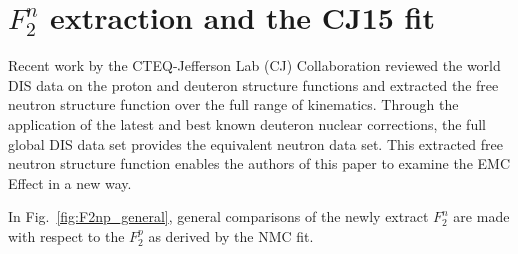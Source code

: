 \documentclass[oneside]{article}
\begin{document}
\section{$F_2^n$ extraction and the CJ15 fit}

Recent work by the CTEQ-Jefferson Lab (CJ) Collaboration reviewed the world DIS data on the proton and deuteron structure functions and extracted the free neutron structure function over the full range of kinematics. Through the application of the latest and best known deuteron nuclear corrections, the full global DIS data set provides the equivalent neutron data set. This extracted free neutron structure function enables the authors of this paper to examine the EMC Effect in a new way. 

In Fig.~\ref{fig:F2np_general}, general comparisons of the newly extract $F_2^n$ are made with respect to the $F_2^p$ as derived by the NMC fit. 
\end{document}
